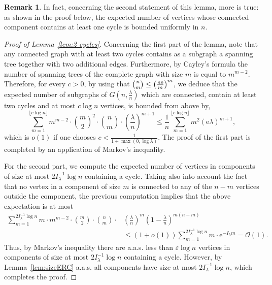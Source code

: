 \documentclass[10pt]{amsart}
\theoremstyle{definition}\newtheorem{defi}[theo]{Definition}\newtheorem{rema}[theo]{Remark}\newtheorem{exam}[theo]{Example}\newtheorem{exem}[theo]{Example}\newtheorem{nota}[theo]{Notation}
\newcommand{\e}{\mathrm{e}}
\newcommand{\cO}{\mathcal{O}}
\begin{document}
\begin{rema}
In fact, concerning the second statement of this lemma, more is true: as shown in the proof below, the expected number of vertices whose connected component contains at least one cycle is bounded uniformly in $n$.
\end{rema}
\begin{proof}[Proof of Lemma~\ref{lem:2 cycles}]
Concerning the first part of the lemma, note that any connected graph with at least two cycles contains as a subgraph a spanning tree together with two additional edges. Furthermore, by Cayley's formula the number of spanning trees of the complete graph with size $m$ is equal to $m^{m-2}$. Therefore, for every $c>0$, by using that $\tbinom{n}{m}\le \left(\tfrac{n\e}{m}\right)^m$, we deduce that the expected number of subgraphs of $G(n,\tfrac{\lambda}{n})$ which are connected, contain at least two cycles and at most $c\log n$ vertices, is bounded from above by,
\begin{equation*}
\sum_{m=1}^{\lfloor c\log n\rfloor} m^{m-2}\cdot \binom{m}{2}^2\cdot \binom{n}{m}\cdot \left(\frac{\lambda}{n}\right)^{m+1} \le \frac{1}{n}\sum_{m=1}^{\lfloor c\log n\rfloor} m^2 (\e\lambda)^{m+1},
\end{equation*}
which is $o(1)$ if one chooses $c<\frac{1}{1+\max(0,\log \lambda)}$. The proof of the first part is completed by an application of Markov's inequality.

For the second part, we compute the expected number of vertices in components of size at most $2 I_{\lambda}^{-1} \log n$ containing a cycle. Taking also into account the fact that no vertex in a component of size $m$ is connected to any of the $n-m$ vertices outside the component, the previous computation implies that the above expectation is at most
\begin{align*}
\sum_{m=1}^{2 I_{\lambda}^{-1} \log n} m\cdot m^{m-2}\cdot \binom{m}{2}\cdot \binom{n}{m} \cdot &\left(\frac{\lambda}{n}\right)^m \left(1-\frac{\lambda}{n}\right)^{m(n-m)}\\
&\le (1+o(1))\sum_{m=1}^{2 I_{\lambda}^{-1} \log n} m\cdot \e^{-I_{\lambda} m}= \cO(1).
\end{align*}
Thus, by Markov's inequality there are a.a.s. less than $\varepsilon \log n$ vertices in components of size at most $2 I_{\lambda}^{-1} \log n$ containing a cycle. However, by Lemma~\ref{lem:sizeERC} a.a.s. all components have size at most $2 I_{\lambda}^{-1} \log n$, which completes the proof.
\end{proof}
\end{document}
